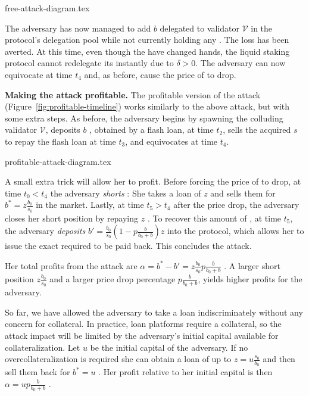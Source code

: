 {free-attack-diagram.tex}

The adversary has now managed to add $b$ \asset delegated to validator $\mathcal{V}$
in the protocol's delegation pool while not currently holding
any \stasset. The loss has been averted.
At this time, even though the
\stassets have changed hands, the liquid staking protocol cannot redelegate
its \assets instantly due to $\delta > 0$.
The adversary can now equivocate at time $t_4$ and, as before, cause the
price of \stasset to drop.


\noindent
\textbf{Making the attack profitable.}
The profitable version of the attack (Figure~\ref{fig:profitable-timeline}) works similarly to the above
attack, but with some extra steps. As before, the adversary begins by spawning the
colluding validator $\mathcal{V}$, deposits $b$ \asset, obtained by a flash loan, at time $t_2$,
sells the acquired $s$ \stasset to repay the flash loan at time $t_3$, and equivocates at time $t_4$.

{profitable-attack-diagram.tex}

A small extra trick will allow her to profit.
Before forcing the price of \stasset to drop, at time $t_0 < t_4$
the adversary \emph{shorts}
\stasset: She takes a loan of $z$ \stassets and
sells them for $b^* = z \frac{b_0}{s_0}$ \asset in the market.
Lastly, at time $t_5 > t_4$ after the price drop, the adversary closes her short position by repaying $z$
\stasset.
To recover this amount of \stasset, at time $t_5$, the adversary \emph{deposits}
$b' = \frac{b_0}{s_0}(1 - p\frac{b}{b_0 + b}) z$ \asset
into the protocol, which allows her to issue the exact required \stasset
to be paid back. This concludes the attack.

Her total profits from the attack are
$\alpha = b^* - b' = z \frac{b_0}{s_0} p \frac{b}{b_0 + b}$ \asset.
A larger short position $z \frac{b_0}{s_0}$ and a larger
\stasset price drop percentage $p \frac{b}{b_0 + b}$, yields higher profits for the adversary.

So far, we have allowed the adversary to take a loan indiscriminately without
any concern for collateral. In practice, loan platforms
require a collateral, so the attack impact will be limited by the adversary's
initial capital available for collateralization.
Let $u$ \asset be the initial capital of the adversary.
If no overcollateralization is required she can obtain a
loan of up to $z = u \frac{s_0}{b_0}$ \stasset and
then sell them back for $b^* = u$ \asset.
Her profit relative to her initial capital is then
$\alpha = u p \frac{b}{b_0 + b}$ \asset.



